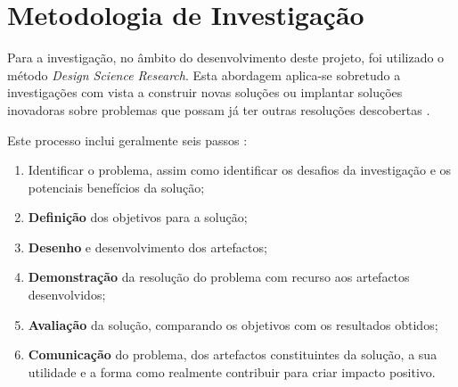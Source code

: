 \section{Metodologia de Investigação}
Para a investigação, no âmbito do desenvolvimento deste projeto, foi utilizado o método \emph{Design Science Research}. Esta abordagem aplica-se sobretudo a investigações com vista a construir novas soluções ou implantar soluções inovadoras sobre problemas que possam já ter outras resoluções descobertas \cite{design_science_research}.

Este processo inclui geralmente seis passos \cite{design_science_research}:
\begin{enumerate}
    \item Identificar o problema, assim como identificar os desafios da investigação e os potenciais benefícios da solução;
    \item \textbf{Definição} dos objetivos para a solução;
    \item \textbf{Desenho} e desenvolvimento dos artefactos;
    \item \textbf{Demonstração} da resolução do problema com recurso aos artefactos desenvolvidos;
    \item \textbf{Avaliação} da solução, comparando os objetivos com os resultados obtidos;
    \item \textbf{Comunicação} do problema, dos artefactos constituintes da solução, a sua utilidade e a forma como realmente contribuir para criar impacto positivo.
\end{enumerate}

